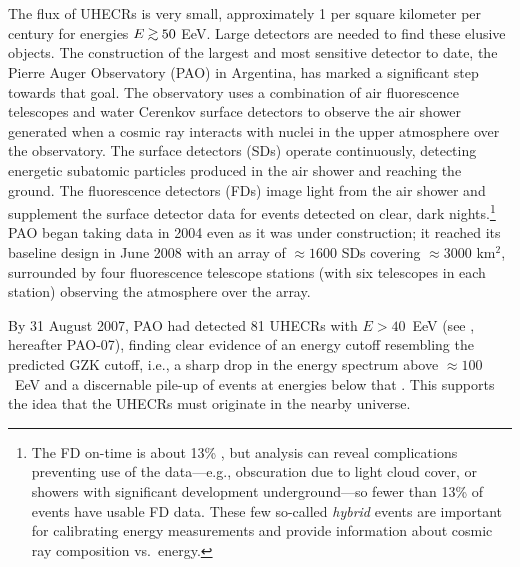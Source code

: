 The flux of UHECRs is very small, approximately 1 per square kilometer per
century for energies $E\gta 50$ EeV.  Large detectors are needed to find
these elusive objects.  The construction of the largest and most sensitive
detector to date, the Pierre Auger Observatory (PAO) \cite{PAO04-Proto}
in Argentina, has marked a significant step towards that goal.  The
observatory uses a combination of air fluorescence telescopes and water
Cerenkov surface detectors to observe the air shower generated when a cosmic
ray interacts with nuclei in the upper atmosphere over the
observatory.  The surface detectors (SDs) operate continuously, detecting
energetic subatomic particles produced in the air shower and reaching the
ground.  The fluorescence detectors (FDs) image light from the air shower and
supplement the surface detector data for events detected on clear, dark
nights.\footnote{The FD on-time is about 13\% \cite{PAO10-GZK}, but analysis
can reveal complications preventing use of the data---e.g., obscuration due to
light cloud cover, or showers with significant development underground---so
fewer than 13\% of events have usable FD data.  These few so-called {\em
hybrid} events are important for calibrating energy measurements and provide
information about cosmic ray composition vs.\ energy.}
PAO began taking data in 2004 even as it was under construction; it reached
its baseline design in June 2008 with an array of $\approx 1600$ SDs
covering $\approx 3000$ km$^2$, surrounded by four
fluorescence telescope stations (with six telescopes in each station)
observing the atmosphere over the array.

By 31 August 2007, PAO had detected 81 UHECRs with $E > 40$~EeV
(see \cite{PAO07-Aniso}, hereafter PAO-07), finding clear evidence of
an energy cutoff resembling the predicted GZK cutoff, i.e., a sharp drop in
the energy spectrum above $\approx 100$~EeV and a discernable pile-up of
events at energies below that \cite{PAO10-GZK}. This supports the idea that
the UHECRs must originate in the nearby universe.

